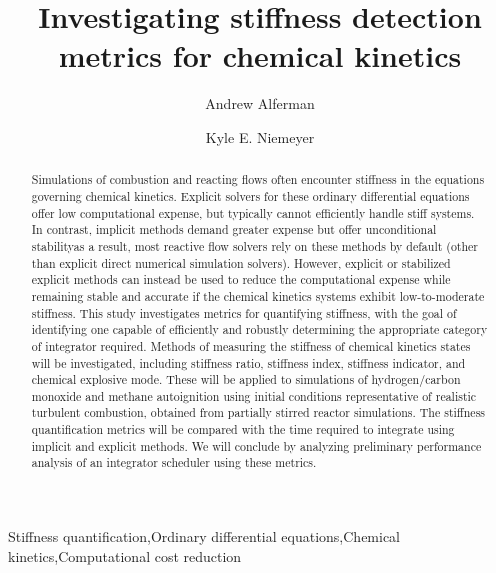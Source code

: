 \documentclass[12pt]{ussci}
\title{ Investigating stiffness detection metrics for chemical kinetics }
\author[1]{Andrew Alferman}
\author[1,*]{Kyle E. Niemeyer}
\affil[1]{School of Mechanical, Industrial, and Manufacturing Engineering\\
		Oregon State University, Corvallis, OR 97331, USA}
\affil[*]{Corresponding author: \email{Kyle.Niemeyer@oregonstate.edu}}
\begin{document}
\maketitle

\begin{abstract} %


Simulations of combustion and reacting flows often encounter stiffness in the equations governing chemical kinetics.
Explicit solvers for these ordinary differential equations offer low computational expense, but typically cannot efficiently handle stiff systems.
In contrast, implicit methods demand greater expense but offer unconditional stability\textendash as a result, most reactive flow solvers rely on these methods by default (other than explicit direct numerical simulation solvers).
However, explicit or stabilized explicit methods can instead be used to reduce the computational expense while remaining stable and accurate if the chemical kinetics systems exhibit low-to-moderate stiffness.
This study investigates metrics for quantifying stiffness, with the goal of identifying one capable of efficiently and robustly determining the appropriate category of integrator required.
Methods of measuring the stiffness of chemical kinetics states will be investigated, including stiffness ratio, stiffness index, stiffness indicator, and chemical explosive mode.
These will be applied to simulations of hydrogen/carbon monoxide and methane autoignition using initial conditions representative of realistic turbulent combustion, obtained from partially stirred reactor simulations.
The stiffness quantification metrics will be compared with the time required to integrate using implicit and explicit methods.
We will conclude by analyzing preliminary performance analysis of an integrator scheduler using these metrics.

\end{abstract}

\begin{keyword}
    Stiffness quantification\sep Ordinary differential equations\sep Chemical kinetics\sep Computational cost reduction
\end{keyword}
\end{document}
